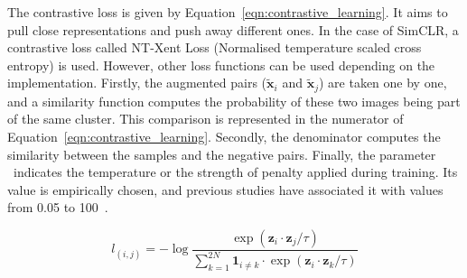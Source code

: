 \documentclass[12pt]{article}
\begin{document}
The contrastive loss is given by Equation~\ref{eqn:contrastive_learning}. It aims to pull close representations and push away different ones. In the case of SimCLR, a contrastive loss called NT-Xent Loss (Normalised temperature scaled cross entropy) is used. However, other loss functions can be used depending on the implementation. Firstly, the augmented pairs ($\tilde{\boldsymbol{x}}_i$ and $\tilde{\boldsymbol{x}}_j$) are taken one by one, and a similarity function computes the probability of these two images being part of the same cluster. This comparison is represented in the numerator of Equation~\ref{eqn:contrastive_learning}. Secondly, the denominator computes the similarity between the samples and the negative pairs. Finally, the parameter \texttau~indicates the temperature or the strength of penalty applied during training. Its value is empirically chosen, and previous studies have associated it with values from 0.05 to 100~\citep{chen2020,caron2020}. %

\begin{equation}
l_{(i,j)}=-\log{\frac{\exp{\left(\boldsymbol{z}_i\cdot\boldsymbol{z}_j/\tau\right)}}{\sum_{k=1}^{2N}\mathbf{1}_{i\neq k}\cdot\exp{\left(\boldsymbol{z}_i\cdot\boldsymbol{z}_k/\tau\right)}}}
\label{eqn:contrastive_learning}
\end{equation} 

\vspace{1.5em}
\end{document}

